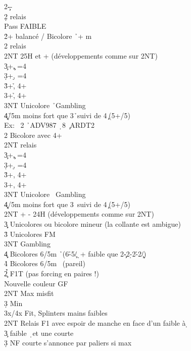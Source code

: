 \documentclass[a4paper]{article}
\begin{document}
\begin{bidtable}
2\c--\+\\
2\d \> relais\+\\
Pass \> FAIBLE \d \\
2\h {}+ balancé / Bicolore \h\ + m\+\\
2\s \> relais\+\\
2NT \> 25H et + (développements comme sur 2NT)\\
3\c {}+\c , =4\h \\
3\d {}+\d , =4\h \\
3\h {}+\h , 4+\c \\
3\s {}+\h , 4+\d \\
3NT \> Unicolore \h\ Gambling\\
4\c\d {}\h /5m moins fort que 3\h\ suivi de 4\c\ (5+/5)\\
Ex: \> \s\ 2 \h\ ADV987 \d\ 8 \c\ ARDT2\-\-\\
2\s \> Bicolore avec 4+\s \+\\
2NT \> relais\+\\
3\c {}+\c , =4\s \\
3\d {}+\d , =4\s \\
3\h {}+\s , 4+\c \\
3\s {}+\s , 4+\d \\
3NT \> Unicolore \s\ Gambling\\
4\c\d {}\s /5m moins fort que 3\s\ suivi de 4\c\ (5+/5)\-\-\\
2NT + - 24H (développements comme sur 2NT)\\
3\c\d \> Unicolores ou bicolore mineur (la collante est ambigue)\\
3\h\s \> Unicolores FM\\
3NT \> Gambling \c \\
4\c\d \> Bicolores 6/5m \h\ (6\h -5\c /\d\ + faible que 2\c -2\d -2\h -2\c /\d )\\
4\h\s \> Bicolores 6/5m \s\ (pareil)\-\\
2\h{}\c \> F1T (pas forcing en paires !)\\
\>Nouvelle couleur GF\+\\
2NT \> Max misfit\\
3\d \> Min\\
3x/4x \> Fit, Splinters mains faibles\-\\
2NT \> Relais F1 avec espoir de manche en face d’un faible à \d \+\\
3\c \> faible \d\ et une courte\+\\
3\d \> NF courte s’annonce par paliers si max\\

\end{bidtable}
\end{document}
